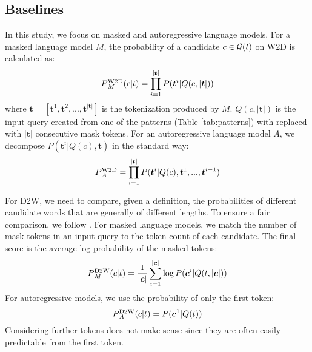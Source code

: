 \documentclass[11pt,a4paper]{article}
\def\uprm#1#2{\mbox{$_#2^{\hbox{\scriptsize #1}}$}}
\begin{document}
\subsection{Baselines}

  
In this study, we focus on masked  and
autoregressive language models. For a masked language model
$M$, the probability of a candidate $c \in {\cal G}(t)$ on W2D  is calculated as:
\begin{equation*}
  P\uprm{W2D}{M} (c|t) = \prod_{i=1}^{|\bm{t}|}P(\bm{t}^i|Q(c,|\bm{t}|))
\end{equation*}
where $\bm{t} = [\bm{t}^1, \bm{t}^2,...,\bm{t}^{|\bm{t}|}]$
is the tokenization produced by  $M$. $Q(c,|\bm{t}|)$ is the
input query
created from one of the patterns (Table \ref{tab:patterns})
with \underline{\hspace{3mm}} replaced with
$|\bm{t}|$ consecutive mask tokens. For an autoregressive
language model $A$, we
decompose $P(\bm{t}^i|Q(c),\bm{t})$ in the standard way:
\begin{equation*}
    P\uprm{W2D}{A} = \prod_{i=1}^{|\bm{t}|}P(\bm{t}^i|Q(c),\bm{t}^{1},...,\bm{t}^{i-1})
\end{equation*}

For D2W, we need to compare, given a definition, the probabilities of
different candidate words that are generally of different lengths.
To ensure a fair comparison,
we follow
. For masked language models, we
match the number of mask tokens in an input query to the
token count of each candidate. The final score is the average log-probability of the masked tokens:
\begin{equation*}
    P\uprm{D2W}{M}(c|t) =
    \frac{1}{|\bm{c}|}\sum_{i=1}^{|\bm{c}|}\log P(\bm{c}^i |
    Q(t,|\bm{c}|))
\end{equation*}
For autoregressive models, we use the probability of only
the first token:
\begin{equation*}
    P\uprm{D2W}{A}(c|t) =
     P(\bm{c}^1 |
    Q(t))
\end{equation*}
Considering further tokens does not make sense since they
are often easily predictable from the first token.

\end{document}
